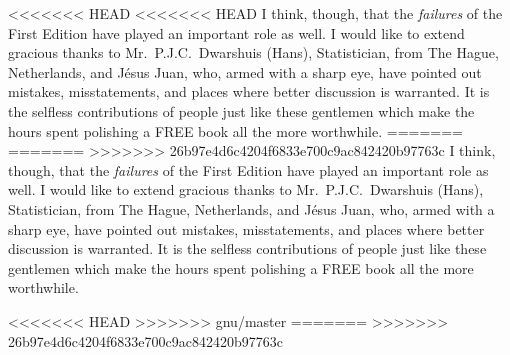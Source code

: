 <<<<<<< HEAD
<<<<<<< HEAD
I think, though, that the \emph{failures} of the First Edition have played an important role as well. I would like to extend gracious thanks to Mr.\ P.J.C.\ Dwarshuis (Hans), Statistician, from The Hague, Netherlands, and J\'{e}{}sus Juan, who, armed with a sharp eye, have pointed out mistakes, misstatements, and places where better discussion is warranted.  It is the selfless contributions of people just like these gentlemen which make the hours spent polishing a FREE book all the more worthwhile.
=======
=======
>>>>>>> 26b97e4d6c4204f6833e700c9ac842420b97763c
I think, though, that the \emph{failures} of the First Edition have played an important role as well. I would like to extend gracious thanks to Mr.\ P.J.C.\ Dwarshuis (Hans), Statistician, from The Hague, Netherlands, and J\'{e}{}sus Juan, who, armed with a sharp eye, have pointed out mistakes, misstatements, and places where better discussion is warranted.  It is the selfless contributions of people just like these gentlemen which make the hours spent polishing a FREE book all the more worthwhile.


\vfill{}
\cleardoublepage
{}
{}
\listoffigures

\vfill{}
\cleardoublepage
{}
{}
\listoftables

<<<<<<< HEAD
>>>>>>> gnu/master
=======
>>>>>>> 26b97e4d6c4204f6833e700c9ac842420b97763c
